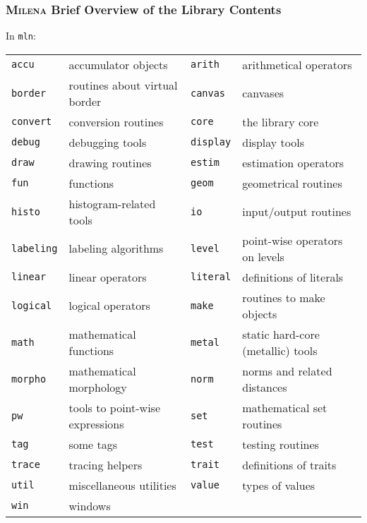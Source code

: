 \documentclass{beamer}
\newcommand{\mln}{\textsc{Milena}\xspace}
\begin{document}





\begin{frame}
  \frametitle{\mln Brief Overview of the Library Contents}

  In \texttt{mln}:
\smallskip

{\scriptsize
\hspace*{-5mm}
    \begin{tabular}{|ll|ll|}
      \hline
\texttt{accu} & accumulator objects &
\texttt{arith} & arithmetical operators \\
\texttt{border} & routines about virtual border &
\texttt{canvas} & canvases \\
\texttt{convert} & conversion routines &
\texttt{core} & the library core \\
\texttt{debug} & debugging tools &
\texttt{display} & display tools \\
\texttt{draw} & drawing routines &
\texttt{estim} & estimation operators \\
\texttt{fun} & functions &
\texttt{geom} & geometrical routines \\
\texttt{histo} & histogram-related tools &
\texttt{io} & input/output routines \\
\texttt{labeling} & labeling algorithms &
\texttt{level} & point-wise operators on levels \\
\texttt{linear} & linear operators &
\texttt{literal} & definitions of literals \\
\texttt{logical} & logical operators &
\texttt{make} & routines to make objects \\
\texttt{math} & mathematical functions &
\texttt{metal} & static hard-core (metallic) tools \\
\texttt{morpho} & mathematical morphology &
\texttt{norm} & norms and related distances \\
\texttt{pw} & tools to point-wise expressions  &
\texttt{set} & mathematical set routines \\
\texttt{tag} & some tags &
\texttt{test} & testing routines \\
\texttt{trace} & tracing helpers &
\texttt{trait} & definitions of traits \\
\texttt{util} & miscellaneous utilities &
\texttt{value} & types of values \\
\texttt{win} & windows & & \\
      \hline
    \end{tabular}
} %

\end{frame}
\end{document}
